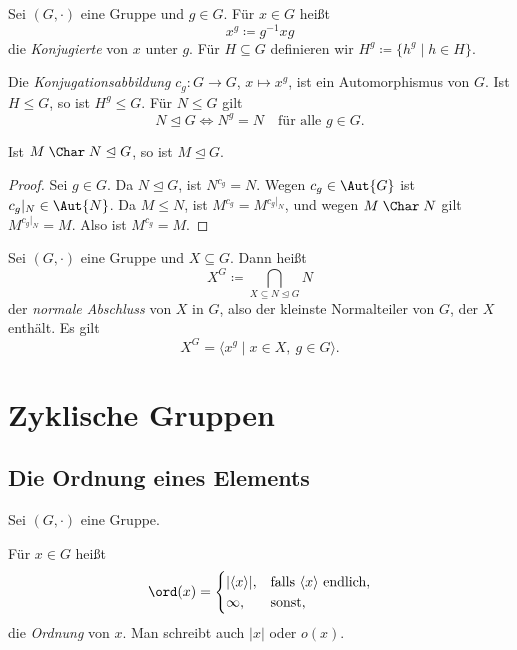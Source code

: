 \documentclass[11pt]{article}
\begin{document}
\begin{definition}[Konjugation]\Theorem
  Sei $(G, \cdot)$ eine Gruppe und $g \in G$. Für $x \in G$ heißt
  \[ x^g \coloneqq g^{-1} x g \]
  die \emph{Konjugierte} von $x$ unter $g$. Für $H \subseteq G$ definieren wir $H^g \coloneqq \{h^g \mid h \in H\}$.
\end{definition}


Die \emph{Konjugationsabbildung} $c_g\colon G \to G$, $x \mapsto x^g$, ist ein Automorphismus von $G$.
Ist $H \le G$, so ist $H^g \le G$.
Für $N \le G$ gilt
\[ N \trianglelefteq G \iff N^g = N \quad \text{für alle } g \in G. \]


\begin{lemma}
  Ist $M \mathrel{\Char} N \trianglelefteq G$, so ist $M \trianglelefteq G$.
\end{lemma}
\begin{proof}
  Sei $g \in G$. Da $N \trianglelefteq G$, ist $N^{c_g} = N$. Wegen $c_g \in \Aut{G}$ ist $c_g|_N \in \Aut{N}$.
  Da $M \le N$, ist $M^{c_g} = M^{c_g|_N}$, und wegen $M \mathrel{\Char} N$ gilt $M^{c_g|_N} = M$.
  Also ist $M^{c_g} = M$.
\end{proof}


\begin{definition}\Theorem
  Sei $(G, \cdot)$ eine Gruppe und $X \subseteq G$. Dann heißt
  \[ X^G \coloneqq \bigcap_{X \subseteq N \trianglelefteq G} N \]
  der \emph{normale Abschluss} von $X$ in $G$, also der kleinste Normalteiler von $G$, der $X$ enthält. Es gilt
  \[ X^G = \langle x^g \mid x \in X,\ g \in G \rangle. \]
\end{definition}


\section{Zyklische Gruppen}

\subsection{Die Ordnung eines Elements}

Sei $(G, \cdot)$ eine Gruppe.

\begin{definition}[Ordnung]\Theorem
  Für $x \in G$ heißt
  \[ \ord(x) = \begin{cases} \lvert \langle x \rangle \rvert, & \text{falls } \langle x \rangle \text{ endlich}, \\ \infty, & \text{sonst}, \end{cases} \]
  die \emph{Ordnung} von $x$. Man schreibt auch $\lvert x \rvert$ oder $o(x)$.
\end{definition}
\end{document}
